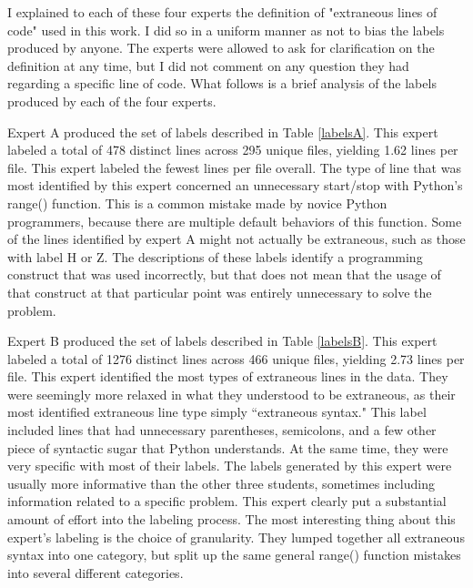 I explained to each of these four experts the definition of "extraneous lines of code" used in this work. I did so in a uniform manner as not to bias the labels produced by anyone. The experts were allowed to ask for clarification on the definition at any time, but I did not comment on any question they had regarding a specific line of code. What follows is a brief analysis of the labels produced by each of the four experts.



Expert A produced the set of labels described in Table \ref{labelsA}. This expert labeled a total of 478 distinct lines across 295 unique files, yielding 1.62 lines per file. This expert labeled the fewest lines per file overall. The type of line that was most identified by this expert concerned an unnecessary start/stop with Python's range() function. This is a common mistake made by novice Python programmers, because there are multiple default behaviors of this function. Some of the lines identified by expert A might not actually be extraneous, such as those with label H or Z. The descriptions of these labels identify a programming construct that was used incorrectly, but that does not mean that the usage of that construct at that particular point was entirely unnecessary to solve the problem. 



Expert B produced the set of labels described in Table \ref{labelsB}. This expert labeled a total of 1276 distinct lines across 466 unique files, yielding 2.73 lines per file. This expert identified the most types of extraneous lines in the data. They were seemingly more relaxed in what they understood to be extraneous, as their most identified extraneous line type simply ``extraneous syntax." This label included lines that had unnecessary parentheses, semicolons, and a few other piece of syntactic sugar that Python understands. At the same time, they were very specific with most of their labels. The labels generated by this expert were usually more informative than the other three students, sometimes including information related to a specific problem. This expert clearly put a substantial amount of effort into the labeling process. The most interesting thing about this expert's labeling is the choice of granularity. They lumped together all extraneous syntax into one category, but split up the same general range() function mistakes into several different categories. 



